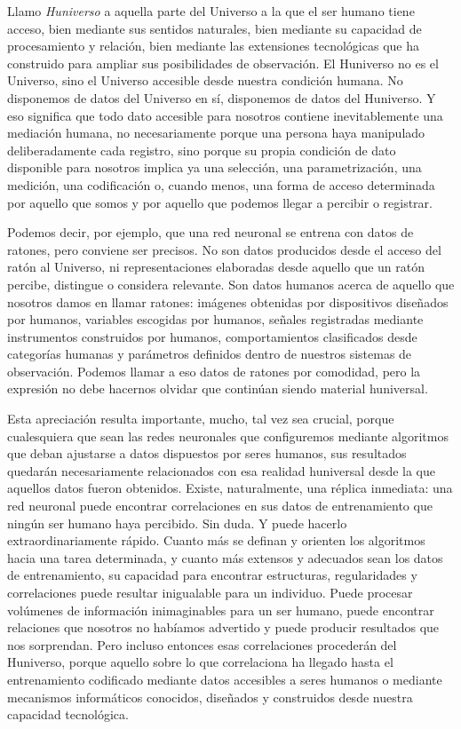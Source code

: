 \documentclass[12pt,a4paper]{article}
\begin{document}
Llamo \emph{Huniverso} a aquella parte del Universo a la que el ser humano tiene acceso, bien mediante sus sentidos naturales, bien mediante su capacidad de procesamiento y relación, bien mediante las extensiones tecnológicas que ha construido para ampliar sus posibilidades de observación. El Huniverso no es el Universo, sino el Universo accesible desde nuestra condición humana. No disponemos de datos del Universo en sí, disponemos de datos del Huniverso. Y eso significa que todo dato accesible para nosotros contiene inevitablemente una mediación humana, no necesariamente porque una persona haya manipulado deliberadamente cada registro, sino porque su propia condición de dato disponible para nosotros implica ya una selección, una parametrización, una medición, una codificación o, cuando menos, una forma de acceso determinada por aquello que somos y por aquello que podemos llegar a percibir o registrar.

Podemos decir, por ejemplo, que una red neuronal se entrena con datos de ratones, pero conviene ser precisos. No son datos producidos desde el acceso del ratón al Universo, ni representaciones elaboradas desde aquello que un ratón percibe, distingue o considera relevante. Son datos humanos acerca de aquello que nosotros damos en llamar ratones: imágenes obtenidas por dispositivos diseñados por humanos, variables escogidas por humanos, señales registradas mediante instrumentos construidos por humanos, comportamientos clasificados desde categorías humanas y parámetros definidos dentro de nuestros sistemas de observación. Podemos llamar a eso datos de ratones por comodidad, pero la expresión no debe hacernos olvidar que continúan siendo material huniversal.

Esta apreciación resulta importante, mucho, tal vez sea crucial, porque cualesquiera que sean las redes neuronales que configuremos mediante algoritmos que deban ajustarse a datos dispuestos por seres humanos, sus resultados quedarán necesariamente relacionados con esa realidad huniversal desde la que aquellos datos fueron obtenidos. Existe, naturalmente, una réplica inmediata: una red neuronal puede encontrar correlaciones en sus datos de entrenamiento que ningún ser humano haya percibido. Sin duda. Y puede hacerlo extraordinariamente rápido. Cuanto más se definan y orienten los algoritmos hacia una tarea determinada, y cuanto más extensos y adecuados sean los datos de entrenamiento, su capacidad para encontrar estructuras, regularidades y correlaciones puede resultar inigualable para un individuo. Puede procesar volúmenes de información inimaginables para un ser humano, puede encontrar relaciones que nosotros no habíamos advertido y puede producir resultados que nos sorprendan. Pero incluso entonces esas correlaciones procederán del Huniverso, porque aquello sobre lo que correlaciona ha llegado hasta el entrenamiento codificado mediante datos accesibles a seres humanos o mediante mecanismos informáticos conocidos, diseñados y construidos desde nuestra capacidad tecnológica.
\end{document}
